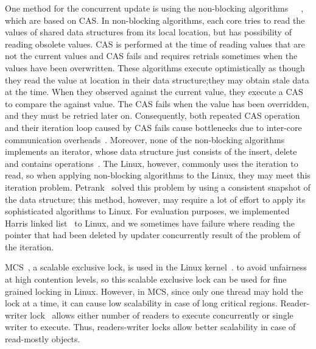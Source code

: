 
One method for the concurrent update is using the non-blocking
algorithms~\cite{Harris2001Lockfree}~\cite{Fomitchev2004Lockfree}~\cite{Timnat2012},
 which are based on CAS.
In non-blocking algorithms, each core tries to read the values of shared
data structures from its local location, but has possibility of reading 
obsolete values.
CAS is performed at the time of reading values that are not the current values
and CAS fails and requires retrials sometimes when the values have been
 overwritten.
These algorithms execute optimistically as though they read the value at
location in their data structure;they may obtain stale data at the time.
When they observed against the current value, they execute a CAS to compare the
against value.
The CAS fails when the value has been overridden, and they must be
retried later on.
Consequently, both repeated CAS operation and their iteration loop caused by
CAS fails cause bottlenecks due to inter-core communication
 overheads~\cite{SilasBoydWickizerPth}.
Moreover, none of the non-blocking algorithms implements an iterator, whose
data structure just consists of the insert, delete and contains
operations~\cite{petrank2013lock}.
The Linux, however, commonly uses the iteration to read, so when applying
non-blocking algorithms to the Linux, they may meet this iteration problem.
Petrank~\cite{petrank2013lock} solved this problem by using a consistent
snapshot of the data structure; this method, however, may require a lot of
effort to apply its sophisticated algorithms to Linux.
For evaluation purposes, we implemented Harris linked
list~\cite{Harris2001Lockfree} to Linux, and we sometimes have failure where
reading the pointer that had been deleted by updater concurrently result of the
problem of the iteration.


MCS~\cite{MellorCrummey91}, a scalable exclusive lock, is used in the Linux
kernel~\cite{MCSLocksKernel}.
to avoid unfairness at high contention levels, so this scalable exclusive
lock can be used for fine grained locking in Linux. 
However, in MCS, since only one thread may hold the lock at a time, it can
cause low scalability in case of long critical regions.
Reader-writer lock~\cite{Courtois71} allows either number of readers to execute
concurrently or single writer to execute.
Thus, readers-writer locks allow better scalability in case of read-mostly 
objects.

